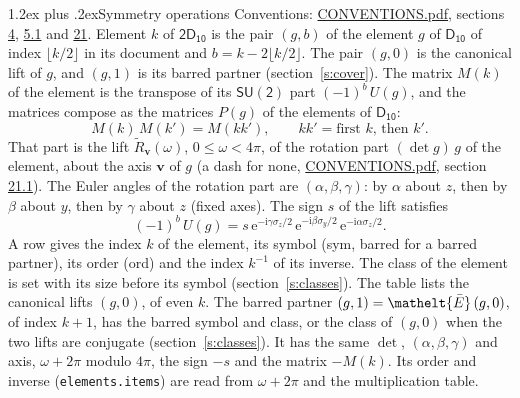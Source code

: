 \documentclass[10pt,a4paper]{article}
\makeatletter
\renewcommand\section{\@startsection{section}{1}{\z@}{-3ex plus -1ex minus -.2ex}%
  {1.2ex plus .2ex}{\normalfont\large\sffamily\bfseries\color{parttitle}}}
\numberwithin{equation}{section}
\newcommand{\eltfont}[1]{{\let\sigma\eltsigma\mathelt{#1}}}
\newcommand{\grp}[1]{\mathsf{#1}}
\newcommand{\elt}[1]{\eltfont{#1}}
\newcommand{\vv}{\mathbf{v}}
\newcommand{\iunit}{\mathrm{i}}
\newcommand{\expe}{\mathrm{e}}
\newcommand{\barred}[1]{\bar{#1}}
\newcommand{\lift}[1]{\tilde{#1}}
\newcommand{\pauli}[1]{\sigma_{#1}}
\makeatother
\begin{document}
\section{Symmetry operations}\label{s:elements}
Conventions: \href{../../CONVENTIONS.pdf}{CONVENTIONS.pdf}, sections \href{../../../rotation/CONVENTIONS.pdf\#conv.4}{4}, \href{../../../rotation/CONVENTIONS.pdf\#conv.5.1}{5.1} and \href{../../CONVENTIONS.pdf\#conv.21}{21}.
\leavevmode\label{n:index.element}\label{n:element.g}Element $k$ of $\grp{2D_{10}}$ is the pair $(g, b)$ of the element $g$ of \href{../../../rotation/data/pdf/D10.pdf}{$\grp{D_{10}}$} of index $\lfloor k/2\rfloor$ in its document and $b = k - 2\lfloor k/2\rfloor$. The pair $(g, 0)$ is the canonical lift of $g$, and $(g, 1)$ is its barred partner (section~\ref{s:cover}). \label{n:matrix.element.pin}\label{n:matrix.element}The matrix $M(k)$ of the element is the transpose of its $\grp{SU(2)}$ part $(-1)^{b}\,U(g)$, and the matrices compose as the matrices $P(g)$ of the elements of $\grp{D_{10}}$:
\begin{equation}\label{e:mprod}M(k)\,M(k') = M(kk'),\qquad kk' = \text{first } k\text{, then } k'.\end{equation}
\leavevmode\label{n:angle.omega}\label{n:vector.axis}\label{n:vector.pole}That part is the lift $\lift{R}_{\vv}(\omega)$, $0 \le \omega < 4\pi$, of the rotation part $(\det g)\,g$ of the element, about the axis $\vv$ of $g$ (a dash for none, \href{../../CONVENTIONS.pdf}{CONVENTIONS.pdf}, section \href{../../CONVENTIONS.pdf\#conv.21.1}{21.1}). \label{n:angle.euler.alpha}\label{n:angle.euler.beta}\label{n:angle.euler.gamma}\label{n:vector.coordinates}The Euler angles of the rotation part are $(\alpha,\beta,\gamma)$: by $\alpha$ about $z$, then by $\beta$ about $y$, then by $\gamma$ about $z$ (fixed axes). \label{n:local.euler.sign}The sign $s$ of the lift satisfies
\begin{equation}\label{e:euler}(-1)^{b}\,U(g) = s\,\expe^{-\iunit\gamma\pauli{z}/2}\,\expe^{-\iunit\beta\pauli{y}/2}\,\expe^{-\iunit\alpha\pauli{z}/2}.\end{equation}
\leavevmode\label{n:index.element.inverse}\label{n:head.sym}\label{n:head.ord}A row gives the index $k$ of the element, its symbol (sym, barred for a barred partner), its order (ord) and the index $k^{-1}$ of its inverse. \label{n:head.class}The class of the element is set with its size before its symbol (section~\ref{s:classes}).
The table lists the canonical lifts $(g, 0)$, of even $k$. The barred partner $(g, 1) = \elt{\barred{E}}\,(g, 0)$, of index $k + 1$, has the barred symbol and class, or the class of $(g, 0)$ when the two lifts are conjugate (section~\ref{s:classes}). It has the same $\det$, $(\alpha,\beta,\gamma)$ and axis, $\omega + 2\pi$ modulo $4\pi$, the sign $-s$ and the matrix $-M(k)$. Its order and inverse (\texttt{elements.items}) are read from $\omega + 2\pi$ and the multiplication table.
\end{document}
